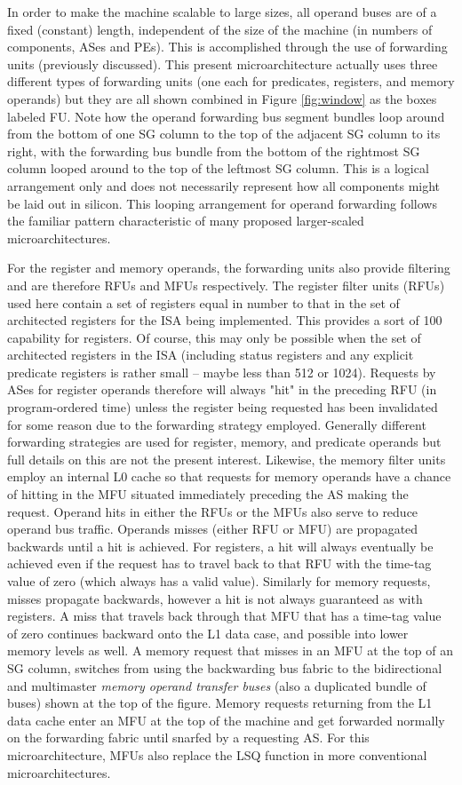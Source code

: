 \documentclass{book}
\begin{document}
In order to make the machine scalable to large sizes,
all operand buses are of a fixed (constant) length, independent of
the size of the machine (in numbers of components, ASes and PEs).
This is accomplished through the use of forwarding units (previously
discussed).  This present microarchitecture actually uses
three different types of forwarding units (one each for predicates,
registers, and memory operands) but they are all shown combined
in Figure \ref{fig:window} as the boxes labeled FU.
Note how the operand forwarding bus segment bundles loop around from
the bottom of one SG column to the top of the adjacent SG
column to its right, with the forwarding bus bundle from the 
bottom of the rightmost
SG column looped around to the top of the leftmost SG column.
This is a logical arrangement only and does not necessarily
represent how all components might be laid out in silicon.
This looping arrangement for operand forwarding follows the
familiar pattern characteristic of many proposed larger-scaled
microarchitectures. \cite{Ranganathan98}

For the register and memory operands, the 
forwarding units also provide filtering and are therefore RFUs and
MFUs respectively.
The register filter units (RFUs) used here contain a set of registers
equal in number to that in the set of architected registers for the
ISA being implemented.  This provides a sort of 100%
capability for registers.  Of course, this may only be possible when the
set of architected registers in the ISA (including status registers
and any explicit predicate registers is rather small -- maybe less than
512 or 1024).  Requests by ASes for register operands therefore
will always "hit" in the preceding RFU (in program-ordered time)
unless the register being requested has been invalidated for some
reason due to the forwarding strategy employed.  Generally
different forwarding strategies are used for register, memory,
and predicate operands but full details on this are not the
present interest.
Likewise, the memory filter units employ an internal L0 cache
so that requests for memory operands have a chance of hitting
in the MFU situated immediately preceding the AS making the request.
Operand hits in either the RFUs or the MFUs also serve to
reduce operand bus traffic.  Operands misses (either RFU or
MFU) are propagated backwards until a hit is achieved.
For registers, a hit will always eventually be achieved even if the request
has to travel back to that RFU with the time-tag value of zero
(which always has a valid value).
Similarly for memory requests, misses propagate backwards, however
a hit is not always guaranteed as with registers.  A miss that
travels back through that MFU that has a time-tag value of
zero continues backward onto the L1 data case, and possible into
lower memory levels as well.  A memory request that misses in an
MFU at the top of an SG column, switches from
using the backwarding bus fabric to the bidirectional and
multimaster \textit{memory operand
transfer buses} (also a duplicated bundle of buses) shown at the top
of the figure.  Memory requests returning from the L1 data cache
enter an MFU at the top of the machine and get forwarded
normally on the forwarding fabric until snarfed by a requesting AS.
For this microarchitecture, MFUs also 
replace the LSQ function in more
conventional microarchitectures.
%
%
\end{document}
